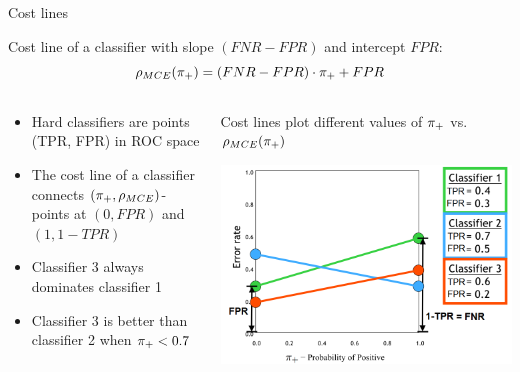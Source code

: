\documentclass[11pt,compress,t,notes=noshow, xcolor=table]{beamer}
\begin{document}



\begin{vbframe}{Cost lines}


Cost line of a classifier with slope $(FNR - FPR)$ and intercept $FPR$:
$$\rho_{MCE}(\pi_{+}) = (FNR - FPR) \cdot \pi_{+} + FPR$$

\begin{columns}[T]
\begin{column}{0.49\textwidth}

\begin{itemize}
\item Hard classifiers are points (TPR, FPR) in ROC space
\item The cost line of a classifier connects $(\pi_{+}, \rho_{MCE})$-points at
$(0, FPR)$ and $(1, 1-TPR)$
\item Classifier 3 always dominates classifier 1
\item Classifier 3 is better than classifier 2 when $\pi_{+} < 0.7$
\end{itemize}

\end{column}

\begin{column}{0.49\textwidth}
\centering
Cost lines plot different values of $\pi_{+}$ vs. $\rho_{MCE}(\pi_{+})$

\includegraphics[width=\textwidth]{figure_man/cost-curves-3.png}
\end{column}
\end{columns}
\end{vbframe}
\end{document}
